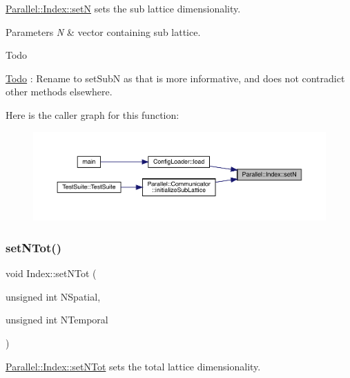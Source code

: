 \mbox{\hyperlink{class_parallel_1_1_index_acbf43868aa2efc7ecf63b5b490fc00a0}{Parallel\+::\+Index\+::setN}} sets the sub lattice dimensionality. 


\begin{DoxyParams}{Parameters}
{\em N} & vector containing sub lattice.\\
\hline
\end{DoxyParams}
\begin{DoxyRefDesc}{Todo}
\item[\mbox{\hyperlink{todo__todo000009}{Todo}}]\+: Rename to set\+SubN as that is more informative, and does not contradict other methods elsewhere. \end{DoxyRefDesc}
Here is the caller graph for this function\+:\nopagebreak
\begin{figure}[H]
\begin{center}
\leavevmode
\includegraphics[width=350pt]{class_parallel_1_1_index_acbf43868aa2efc7ecf63b5b490fc00a0_icgraph}
\end{center}
\end{figure}
\mbox{\label{class_parallel_1_1_index_a125dc4d990ded636c91b959474c27d1f}} 
\subsubsection{\texorpdfstring{setNTot()}{setNTot()}}
{\footnotesize\ttfamily void Index\+::set\+N\+Tot (\begin{DoxyParamCaption}\item[{unsigned int}]{N\+Spatial,  }\item[{unsigned int}]{N\+Temporal }\end{DoxyParamCaption})\hspace{0.3cm}{\ttfamily [static]}}



\mbox{\hyperlink{class_parallel_1_1_index_a125dc4d990ded636c91b959474c27d1f}{Parallel\+::\+Index\+::set\+N\+Tot}} sets the total lattice dimensionality. 


